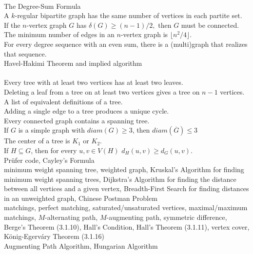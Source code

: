 \documentclass[12pt]{article}
\theoremstyle{homework}
\begin{document}
\\
The Degree-Sum Formula\\
A $k$-regular bipartite graph has the same number of vertices in each partite set.\\
If the $n$-vertex graph $G$ has $\delta(G) \geq (n-1)/2,$ then $G$ must be connected.\\
The minimum number of edges in an $n$-vertex graph is $\lfloor n^2/4 \rfloor.$\\
For every degree sequence with an even sum, there is a (multi)graph that realizes that sequence.\\
Havel-Hakimi Theorem and implied algorithm\\

\\
Every tree with at least two vertices has at least two leaves.\\
Deleting a leaf from a tree on at least two vertices gives a tree on $n-1$ vertices.\\
A list of equivalent definitions of a tree.\\
Adding a single edge to a tree produces a unique cycle.\\
Every connected graph contains a spanning tree.\\
If $G$ is a simple graph with $diam(G) \geq 3$, then $diam(\overline{G}) \leq 3$\\
The center of a tree is $K_1$ or $K_2.$\\
If $H \subseteq G$, then for every $u,v \in V(H)$ $d_H(u,v) \geq d_G(u,v).$\\


  Pr\"{u}fer code, Cayley's Formula\\


  minimum weight spanning tree, weighted graph, Kruskal's Algorithm for finding minimum weight spanning trees, Dijkstra's Algorithm for finding the distance between all vertices and a given vertex, Breadth-First Search for finding distances in an unweighted graph, Chinese Postman Problem\\

 matchings, perfect matching, saturated/unsaturated vertices, maximal/maximum matchings, $M$-alternating path, $M$-augmenting path, symmetric difference, Berge's Theorem (3.1.10), Hall's Condition, Hall's Theorem (3.1.11), vertex cover, K\"{o}nig-Egerv\'{a}ry Theorem (3.1.16)\\

 Augmenting Path Algorithm, Hungarian Algorithm\\
\end{document}
